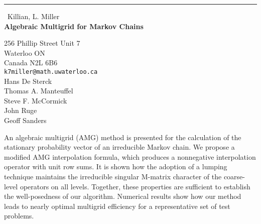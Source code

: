 \documentclass{report}
\begin{document}
\begin{center}
\rule{6in}{1pt} \
{\large Killian, L. Miller \\
{\bf Algebraic Multigrid for Markov Chains}}

256 Phillip Street Unit 7 \\ Waterloo ON \\ Canada N2L 6B6
\\
{\tt k7miller@math.uwaterloo.ca}\\
Hans De Sterck\\
Thomas A. Manteuffel\\
Steve F. McCormick\\
John Ruge\\
Geoff Sanders\end{center}

An algebraic multigrid (AMG) method is presented for the calculation of
the stationary probability vector of an irreducible Markov chain. We
propose a modified AMG interpolation formula, which produces a
nonnegative interpolation operator with unit row sums. It is shown how
the adoption of a lumping technique maintains the irreducible singular
M-matrix character of the coarse-level operators on all levels. Together,
these properties are sufficient to establish the well-posedness of our
algorithm. Numerical results show how our method leads to nearly optimal
multigrid efficiency for a representative set of test problems.
\end{document}
